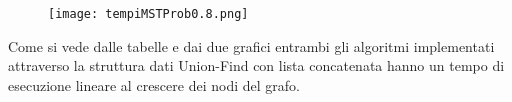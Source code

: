 \documentclass{article}
\begin{document}
 \begin{figure}[h]
     \centering
     \texttt{[image: tempiMSTProb0.8.png]}
     \label{fig:tempiMST08}
 \end{figure}
 
 Come si vede dalle tabelle e dai due grafici entrambi gli algoritmi implementati attraverso la struttura dati Union-Find con lista concatenata hanno un tempo di esecuzione lineare al crescere dei nodi del grafo.
 
\end{document}

